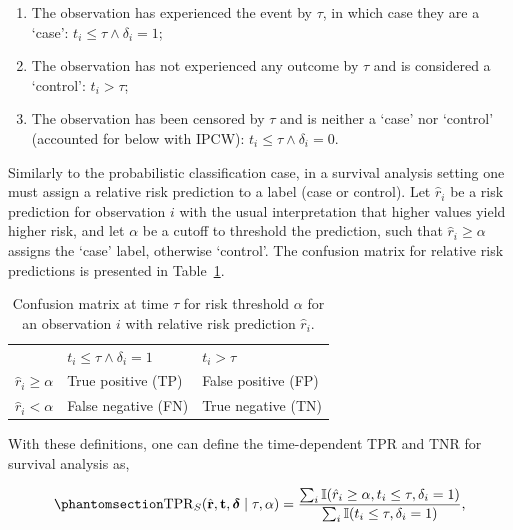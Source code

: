 \documentclass[
  letterpaper,
  krantz2]{style/krantz}
\providecommand{\tightlist}{%
  \setlength{\itemsep}{0pt}\setlength{\parskip}{0pt}}
\begin{document}
\begin{enumerate}
\def\labelenumi{\arabic{enumi}.}
\tightlist
\item
  The observation has experienced the event by \(\tau\), in which case
  they are a `case': \(t_i \le \tau \wedge \delta_i = 1\);
\item
  The observation has not experienced any outcome by \(\tau\) and is
  considered a `control': \(t_i > \tau\);
\item
  The observation has been censored by \(\tau\) and is neither a `case'
  nor `control' (accounted for below with IPCW):
  \(t_i \le \tau \wedge \delta_i = 0\).
\end{enumerate}

Similarly to the probabilistic classification case, in a survival
analysis setting one must assign a relative risk
prediction to a label (case or control). Let \(\hat{r}_i\) be a risk
prediction for observation \(i\) with the usual interpretation that
higher values yield higher risk, and let \(\alpha\) be a cutoff to
threshold the prediction, such that \(\hat{r}_i \ge \alpha\) assigns the
`case' label, otherwise `control'. The confusion
matrix for relative risk predictions is
presented in Table~\ref{tbl-confusion-survival}.

\begin{longtable}[]{@{}lll@{}}
\caption{Confusion matrix at time \(\tau\) for risk threshold \(\alpha\)
for an observation \(i\) with relative risk prediction
\(\hat{r}_i\).}\label{tbl-confusion-survival}\tabularnewline
\toprule\noalign{}
\endfirsthead
\endhead
\bottomrule\noalign{}
\endlastfoot
& \(t_i \le \tau \wedge \delta_i = 1\) & \(t_i > \tau\) \\
\(\hat{r}_i \ge \alpha\) & True positive (TP) & False positive (FP) \\
\(\hat{r}_i < \alpha\) & False negative (FN) & True negative (TN) \\
\end{longtable}

With these definitions, one can define the time-dependent TPR and TNR
for survival analysis
as,

\begin{equation}\phantomsection\label{eq-tpr}{
\mathrm{TPR}_S(\hat{\mathbf{r}}, \mathbf{t}, \boldsymbol{\delta}\mid  \tau, \alpha) = \frac{\sum_i \mathbb{I}(\hat{r}_i \ge \alpha, t_i \le \tau, \delta_i = 1)}{\sum_i \mathbb{I}(t_i \le \tau, \delta_i = 1)},
}\end{equation}
\end{document}
